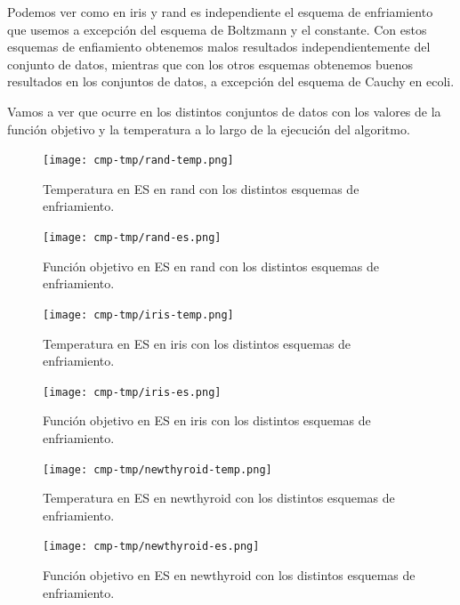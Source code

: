 \documentclass[12pt, spanish]{article}
\begin{document}
Podemos ver como en iris y rand es independiente el esquema de enfriamiento que usemos a excepción del esquema de Boltzmann y el constante. Con estos esquemas de enfiamiento obtenemos malos resultados independientemente del conjunto de datos, mientras que con los otros esquemas obtenemos buenos resultados en los conjuntos de datos, a excepción del esquema de Cauchy en ecoli.

Vamos a ver que ocurre en los distintos conjuntos de datos con los valores de la función objetivo y la temperatura a lo largo de la ejecución del algoritmo.


\begin{figure}[H]
	\centering
	\texttt{[image: cmp-tmp/rand-temp.png]}
	
	\caption{Temperatura en ES en rand con los distintos esquemas de enfriamiento.}
	\label{fig:es-cmp2}
\end{figure}
\begin{figure}[H]
	\centering
	\texttt{[image: cmp-tmp/rand-es.png]}
	
	\caption{Función objetivo en ES en rand con los distintos esquemas de enfriamiento.}
	\label{fig:es-cmp1}
\end{figure}


\begin{figure}[H]
	\centering
	\texttt{[image: cmp-tmp/iris-temp.png]}
	
	\caption{Temperatura en ES en iris con los distintos esquemas de enfriamiento.}
	\label{fig:es-cmp2}
\end{figure}

\begin{figure}[H]
	\centering
	\texttt{[image: cmp-tmp/iris-es.png]}
	
	\caption{Función objetivo en ES en iris con los distintos esquemas de enfriamiento.}
	\label{fig:es-cmp1}
\end{figure}







\begin{figure}[H]
	\centering
	\texttt{[image: cmp-tmp/newthyroid-temp.png]}
	
	\caption{Temperatura en ES en newthyroid con los distintos esquemas de enfriamiento.}
	\label{fig:es-cmp2}
\end{figure}

\begin{figure}[H]
	\centering
	\texttt{[image: cmp-tmp/newthyroid-es.png]}
	
	\caption{Función objetivo en ES en newthyroid con los distintos esquemas de enfriamiento.}
	\label{fig:es-cmp1}
\end{figure}
\end{document}
